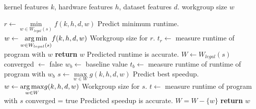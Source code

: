 \begin{algorithmic}[1]
\Require kernel features $k$, hardware features $h$, dataset features $d$.
\Ensure workgroup size $w$

\State $r \leftarrow \underset{w \in W_{legal}(s)}{\min} f(k,h,d,w)$
\Comment Predict minimum runtime.
\State $w \leftarrow \underset{w \in W_{legal}(s)}{\operatorname*{arg\,min}} f(k,h,d,w)$
\Comment Workgroup size for $r$.
\State $t_r \leftarrow$ measure runtime of program with $w$
  \State \textbf{return} $w$
\Comment Predicted runtime is accurate.
\Else
   \State $W \leftarrow W_{legal}(s)$
   \State converged $\leftarrow$ false
   \State $w_b \leftarrow$ baseline value
   \State $t_b \leftarrow$ measure runtime of runtime of program with $w_b$
     \State $s \leftarrow \underset{w \in W}{\max} g(k,h,d,w)$
     \Comment Predict best speedup.
     \State $w \leftarrow \underset{w \in W}{\operatorname*{arg\,max}} g(k,h,d,w)$
     \Comment Workgroup size for $s$.
     \State $t \leftarrow$ measure runtime of program with $s$
       \State converged = true
       \Comment Predicted speedup is accurate.
     \Else
       \State $W = W - \{w\}$
     \EndIf
   \EndWhile
   \State \textbf{return} $w$
\EndIf
\end{algorithmic}
